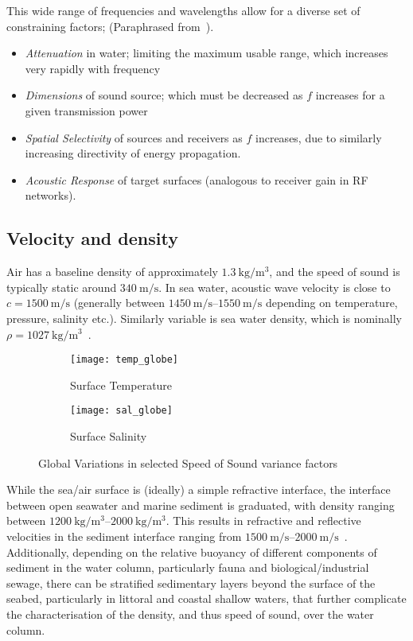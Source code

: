 This wide range of frequencies and wavelengths allow for a diverse set of constraining factors; (Paraphrased from~\citet{lurton2010}).

\begin{itemize}
  \item \emph{Attenuation} in water; limiting the maximum usable range, which increases very rapidly with frequency
  \item \emph{Dimensions} of sound source; which must be decreased as $f$ increases for a given transmission power
  \item \emph{Spatial Selectivity} of sources and receivers as $f$ increases, due to similarly increasing directivity of energy propagation.
  \item \emph{Acoustic Response} of target surfaces (analogous to receiver gain in RF networks).
\end{itemize}

\subsection{Velocity and density}\label{sec:aco_vel}

Air has a baseline density of approximately $\SI{1.3}{\kilogram\per\meter\cubed}$, and the speed of sound is typically static around $\SI{340}{\meter\per\second}$.
In sea water, acoustic wave velocity is close to $c=\SI{1500}{\meter\per\second}$ (generally between $\SIrange{1450}{1550}{\meter\per\second}$ depending on temperature, pressure, salinity etc.).
Similarly variable is sea water density, which is nominally $\rho = \SI{1027}{\kilogram\per\meter\cubed}$~\cite{Wang2010}.

\begin{figure}
	\centering
	\begin{subfigure}[t]{0.8\textwidth}
		\centering
		\texttt{[image: temp\_globe]}
		\caption{Surface Temperature}
		\label{fig:temp_globe}
	\end{subfigure}
	\begin{subfigure}[t]{0.8\textwidth}
		\centering
		\texttt{[image: sal\_globe]}
		\caption{Surface Salinity}
		\label{fig:sal_globe}
	\end{subfigure}
	\caption{Global Variations in selected Speed of Sound variance factors}
	\label{fig:globes}
\end{figure}



While the sea/air surface is (ideally) a simple refractive interface, the interface between open seawater and marine sediment is graduated, with density ranging between $\SIrange{1200}{2000}{\kilogram\per\meter\cubed}$. 
This results in refractive and reflective velocities in the sediment interface ranging from $\SIrange{1500}{2000}{\meter\per\second}$~\cite{lurton2010}.
Additionally, depending on the relative buoyancy of different components of sediment in the water column, particularly fauna and biological/industrial sewage, there can be stratified sedimentary layers beyond the surface of the seabed, particularly in littoral and coastal shallow waters, that further complicate the characterisation of the density, and thus speed of sound, over the water column.

